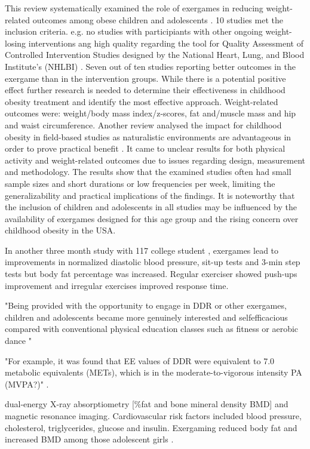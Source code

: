 This review systematically examined the role of exergames in reducing weight-related outcomes among obese children and adolescents \cite{valeriani2021exergames}. 10 studies met the inclusion criteria. e.g. no studies with participiants with other ongoing weight-losing interventions ang high quality regarding the tool for Quality Assessment of Controlled Intervention Studies designed by the National Heart, Lung, and Blood Institute’s (NHLBI) \cite{link_studyquality}. Seven out of ten studies reporting better outcomes in the exergame than in the intervention groups. While there is a potential positive effect further research is needed to determine their effectiveness in childhood obesity treatment and identify the most effective approach.  Weight-related outcomes were: weight/body mass index/z-scores, fat and/muscle mass and hip and waist circumference. 
Another review analysed the impact for childhood obesity in field-based studies \cite{gao2014field} as naturalistic environments are advantageous in order to prove practical benefit \cite{baranowski2012impact}. It came to unclear results for both physical activity and weight-related outcomes due to issues regarding design, measurement and methodology. The results show that the examined studies often had small sample sizes and short durations or low frequencies per week, limiting the generalizability and practical implications of the findings. It is noteworthy that the inclusion of children and adolescents in all studies may be influenced by the availability of exergames designed for this age group and the rising concern over childhood obesity in the USA.

In another three month study with 117 college student \cite{huang2017can}, exergames lead to improvements in normalized diastolic blood pressure, sit-up tests and 3-min step tests but body fat percentage was increased. Regular exerciser showed push-ups improvement and irregular exercises improved response time.

"Being provided with the opportunity to engage in DDR or other exergames, children and adolescents became more genuinely interested and selfefficacious compared with conventional physical education classes such as fitness or aerobic dance "

"For example, it was found that EE values of DDR were equivalent to 7.0 metabolic equivalents (METs), which is in the moderate-to-vigorous intensity PA (MVPA?)" \cite{gao2014field}.


dual-energy X-ray absorptiometry [\%fat and bone mineral density {BMD}] and magnetic resonance imaging. Cardiovascular risk factors included blood pressure, cholesterol, triglycerides, glucose and insulin.
Exergaming reduced body fat and increased BMD among those adolescent girls \cite{staiano2017randomized}.

